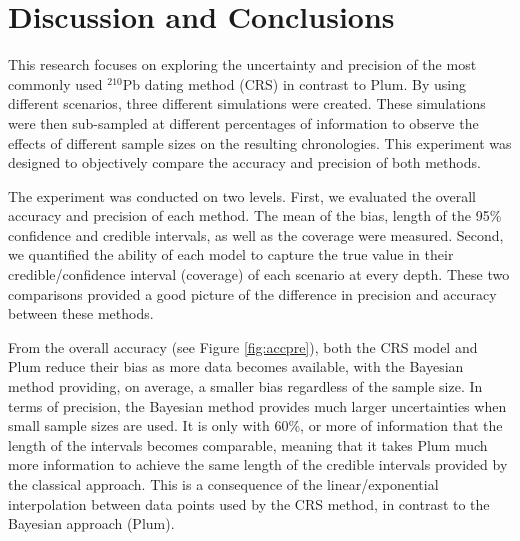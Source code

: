 \documentclass [10pt] {article}
\begin{document}
\section{Discussion and Conclusions}

This research focuses on exploring the uncertainty and precision of the most commonly used $^{210}$Pb dating method (CRS) in contrast to Plum.
By using different scenarios, three different simulations were created. These simulations were then sub-sampled at different percentages of information to observe the effects of different sample sizes on the resulting chronologies. This experiment was designed to objectively compare the accuracy and precision of both methods.


The experiment was conducted on two levels.
First, we evaluated the overall accuracy and precision of each method.
The mean of the bias, length of the 95\% confidence and credible intervals, as well as the coverage were measured.
Second, we quantified the ability of each model to capture the true value in their credible/confidence interval (coverage) of each scenario at every depth. These two comparisons provided a good picture of the difference in precision and accuracy between these methods.


From the overall accuracy (see Figure \ref{fig:accpre}), both the CRS model and Plum reduce their bias as more data becomes available, with the Bayesian method providing, on average, a smaller bias regardless of the sample size. 
In terms of precision, the Bayesian method provides much larger uncertainties when small sample sizes are used. 
It is only with 60\%, or more of information that the length of the intervals becomes comparable, meaning that it takes Plum much more information to achieve the same length of the credible intervals provided by the classical approach. 
This is a consequence of the linear/exponential interpolation between data points used by the CRS method, in contrast to the Bayesian approach (Plum).  
\end{document}
